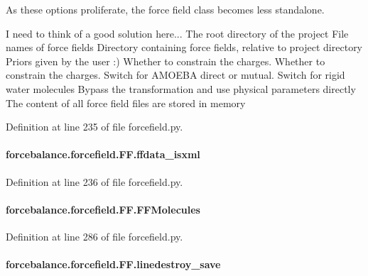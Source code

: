 As these options proliferate, the force field class becomes less standalone. 

I need to think of a good solution here... The root directory of the project File names of force fields Directory containing force fields, relative to project directory Priors given by the user \-:) Whether to constrain the charges. Whether to constrain the charges. Switch for A\-M\-O\-E\-B\-A direct or mutual. Switch for rigid water molecules Bypass the transformation and use physical parameters directly The content of all force field files are stored in memory 

Definition at line 235 of file forcefield.\-py.

\hypertarget{classforcebalance_1_1forcefield_1_1FF_af942210095e12b4995a64ca461cd5d76}{
\paragraph[{ffdata\-\_\-isxml}]{\setlength{\rightskip}{0pt plus 5cm}forcebalance.\-forcefield.\-F\-F.\-ffdata\-\_\-isxml}}\label{classforcebalance_1_1forcefield_1_1FF_af942210095e12b4995a64ca461cd5d76}


Definition at line 236 of file forcefield.\-py.

\hypertarget{classforcebalance_1_1forcefield_1_1FF_aa5ba15f51599b631b9be90cda847f1d9}{
\paragraph[{F\-F\-Molecules}]{\setlength{\rightskip}{0pt plus 5cm}forcebalance.\-forcefield.\-F\-F.\-F\-F\-Molecules}}\label{classforcebalance_1_1forcefield_1_1FF_aa5ba15f51599b631b9be90cda847f1d9}


Definition at line 286 of file forcefield.\-py.

\hypertarget{classforcebalance_1_1forcefield_1_1FF_aa4f1adc1fc16e922c98145553ac5b67f}{
\paragraph[{linedestroy\-\_\-save}]{\setlength{\rightskip}{0pt plus 5cm}forcebalance.\-forcefield.\-F\-F.\-linedestroy\-\_\-save}}\label{classforcebalance_1_1forcefield_1_1FF_aa4f1adc1fc16e922c98145553ac5b67f}


